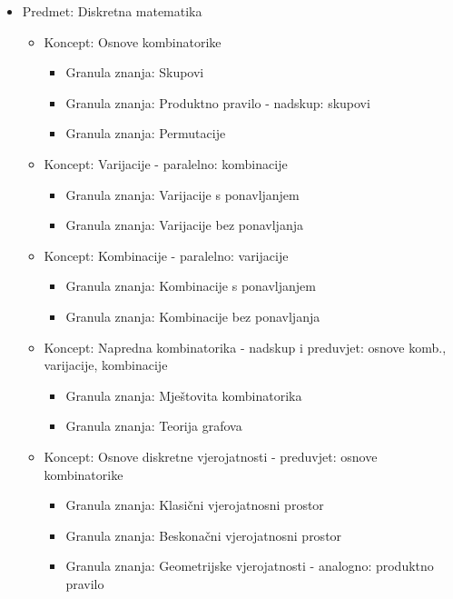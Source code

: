 \documentclass[times, utf8, zavrsni, numeric]{fer}
\begin{document}
\begin{itemize}
	\item Predmet: Diskretna matematika
	\begin{itemize}
		\item Koncept: Osnove kombinatorike
		\begin{itemize}
			\item Granula znanja: Skupovi
			\item Granula znanja: Produktno pravilo
			\newline - nadskup: skupovi
			\item Granula znanja: Permutacije
		\end{itemize}
		\item Koncept: Varijacije - paralelno: kombinacije
		\begin{itemize}
			\item Granula znanja: Varijacije s ponavljanjem
			\item Granula znanja: Varijacije bez ponavljanja
		\end{itemize}
		\item Koncept: Kombinacije - paralelno: varijacije
		\begin{itemize}
			\item Granula znanja: Kombinacije s ponavljanjem
			\item Granula znanja: Kombinacije bez ponavljanja
		\end{itemize}
		\item Koncept: Napredna kombinatorika
		\newline - nadskup i preduvjet: osnove komb., varijacije, kombinacije
		\begin{itemize}
			\item Granula znanja: Mještovita kombinatorika
			\item Granula znanja: Teorija grafova
		\end{itemize}
		\item Koncept: Osnove diskretne vjerojatnosti
		\newline - preduvjet: osnove kombinatorike
		\begin{itemize}
			\item Granula znanja: Klasični vjerojatnosni prostor
			\item Granula znanja: Beskonačni vjerojatnosni prostor
			\item Granula znanja: Geometrijske vjerojatnosti
			\newline - analogno: produktno pravilo
		\end{itemize}
	\end{itemize}
\end{itemize}
\end{document}
